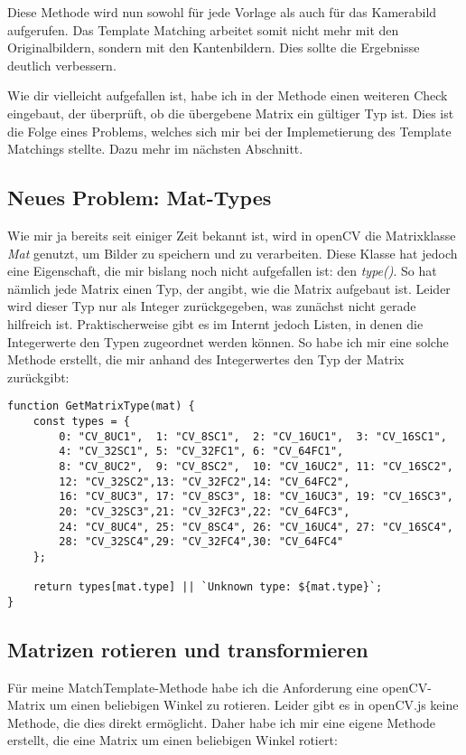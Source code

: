Diese Methode wird nun sowohl für jede Vorlage als auch für das Kamerabild aufgerufen. Das Template Matching arbeitet somit nicht mehr mit den Originalbildern, sondern mit den Kantenbildern. Dies sollte die Ergebnisse deutlich verbessern.

Wie dir vielleicht aufgefallen ist, habe ich in der Methode einen weiteren Check eingebaut, der überprüft, ob die übergebene Matrix ein gültiger Typ ist. Dies ist die Folge eines Problems, welches sich mir bei der Implemetierung des Template Matchings stellte. Dazu mehr im nächsten Abschnitt.

\subsection{Neues Problem: Mat-Types}
Wie mir ja bereits seit einiger Zeit bekannt ist, wird in openCV die Matrixklasse \textit{Mat} genutzt, um Bilder zu speichern und zu verarbeiten. Diese Klasse hat jedoch eine Eigenschaft, die mir bislang noch nicht aufgefallen ist: den \textit{type()}. So hat nämlich jede Matrix einen Typ, der angibt, wie die Matrix aufgebaut ist. Leider wird dieser Typ nur als Integer zurückgegeben, was zunächst nicht gerade hilfreich ist. Praktischerweise gibt es im Internt jedoch Listen, in denen die Integerwerte den Typen zugeordnet werden können. So habe ich mir eine solche Methode erstellt, die mir anhand des Integerwertes den Typ der Matrix zurückgibt:

\begin{lstlisting}[style=JavaScript]
function GetMatrixType(mat) {
    const types = {
        0: "CV_8UC1",  1: "CV_8SC1",  2: "CV_16UC1",  3: "CV_16SC1",
        4: "CV_32SC1", 5: "CV_32FC1", 6: "CV_64FC1",
        8: "CV_8UC2",  9: "CV_8SC2",  10: "CV_16UC2", 11: "CV_16SC2",
        12: "CV_32SC2",13: "CV_32FC2",14: "CV_64FC2",
        16: "CV_8UC3", 17: "CV_8SC3", 18: "CV_16UC3", 19: "CV_16SC3",
        20: "CV_32SC3",21: "CV_32FC3",22: "CV_64FC3",
        24: "CV_8UC4", 25: "CV_8SC4", 26: "CV_16UC4", 27: "CV_16SC4",
        28: "CV_32SC4",29: "CV_32FC4",30: "CV_64FC4"
    };
    
    return types[mat.type] || `Unknown type: ${mat.type}`;
}
\end{lstlisting}

\subsection{Matrizen rotieren und transformieren}
Für meine MatchTemplate-Methode habe ich die Anforderung eine openCV-Matrix um einen beliebigen Winkel zu rotieren. Leider gibt es in openCV.js keine Methode, die dies direkt ermöglicht. Daher habe ich mir eine eigene Methode erstellt, die eine Matrix um einen beliebigen Winkel rotiert:

